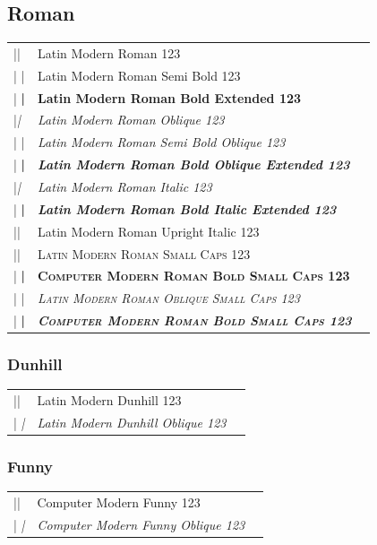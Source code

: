 \documentclass[a4paper]{article}
\makeatletter
\newenvironment{vrb}{\begin{tabular}{@{}p{5cm}ll@{}}}{\end{tabular}}
\makeatother
\begin{document}
\subsection*{Roman}

\rmfamily
\begin{vrb}
|\rmfamily| & {Latin Modern Roman 123} \\
|  \sbweight| & {\sbweight Latin Modern Roman Semi Bold 123} \\
|  \bfseries| & {\bfseries Latin Modern Roman Bold Extended 123} \\
|\slshape| & {\slshape Latin Modern Roman Oblique 123} \\
|  \sbweight| & {\sbweight\slshape Latin Modern Roman Semi Bold Oblique 123} \\
|  \bfseries| & {\bfseries\slshape Latin Modern Roman Bold Oblique Extended 123} \\
|\itshape| & {\itshape Latin Modern Roman Italic 123} \\
|  \bfseries| & {\bfseries\itshape Latin Modern Roman Bold Italic Extended 123} \\
|\uishape| & {\uishape Latin Modern Roman Upright Italic 123} \\
|\scshape| & {\scshape Latin Modern Roman Small Caps 123} \\
|  \bfseries| & {\bfseries\scshape Computer Modern Roman Bold Small Caps 123} \\
|  \sishape| & {\scshape\slshape Latin Modern Roman Oblique Small Caps 123} \\
|    \bfseries| & {\slshape\bfseries\scshape Computer Modern Roman Bold Small Caps 123} \\
\end{vrb}

\subsubsection*{Dunhill}

\tistyle
\begin{vrb}
|\tistyle | & {Latin Modern Dunhill 123} \\
|  \slshape| & {\slshape Latin Modern Dunhill Oblique 123} \\
\end{vrb}

\subsubsection*{Funny}

\selectfont
\begin{vrb}
|\fontfamily{cmfr}\selectfont | & {Computer Modern Funny 123} \\
|  \itshape| & {\itshape Computer Modern Funny Oblique 123} \\
\end{vrb}
\end{document}
